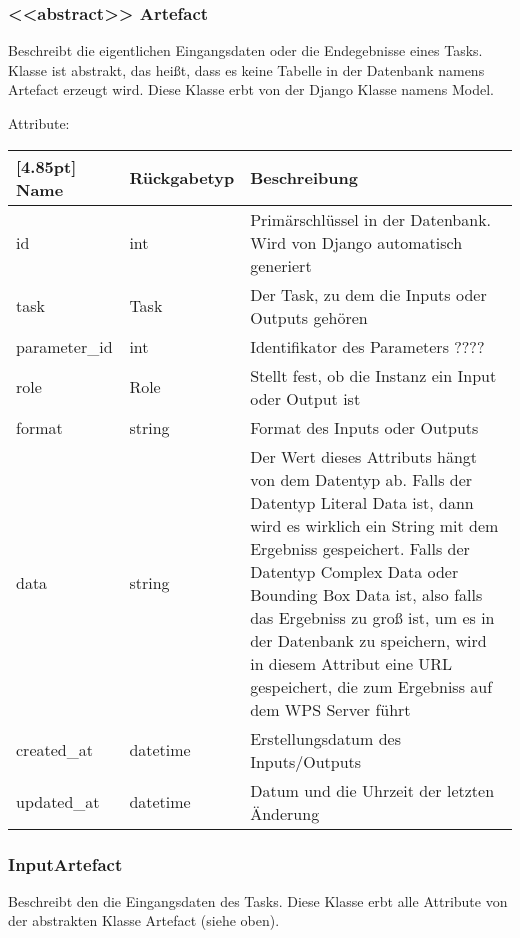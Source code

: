         \subsubsection{<<abstract>> Artefact}
			Beschreibt die eigentlichen Eingangsdaten oder die Endegebnisse eines Tasks. Klasse ist abstrakt, das heißt, dass es keine Tabelle in der Datenbank namens \glqq Artefact \grqq erzeugt wird. \newline 
			Diese Klasse erbt von der Django Klasse namens \glqq Model\grqq .
			
			Attribute:
			\begin{center}
				\setlength\tabcolsep{5pt}
				\renewcommand{\arraystretch}{1.5}
				
				\begin{tabularx}{\textwidth}{|l|l|X|}
					\hline
					\rowcolor[gray]{0.75}[4.85pt]
					Name & Rückgabetyp & Beschreibung \\ \hline 
					id & int & Primärschlüssel in der Datenbank. Wird von Django automatisch generiert \\ \hline
					task & Task & Der Task, zu dem die Inputs oder Outputs gehören\\ \hline
					parameter\_id & int & Identifikator des Parameters ???? \\ \hline
					role & Role & Stellt fest, ob die Instanz ein Input oder Output ist \\ \hline
					format & string & Format des Inputs oder Outputs \\ \hline
					data & string & Der Wert dieses Attributs hängt von dem Datentyp ab. Falls der Datentyp Literal Data ist, dann wird es wirklich ein String mit dem Ergebniss gespeichert. Falls der Datentyp Complex Data oder Bounding Box Data ist, also falls das Ergebniss zu groß ist, um es in der Datenbank zu speichern, wird in diesem Attribut eine URL gespeichert, die zum Ergebniss auf dem WPS Server führt \\ \hline
					created\_at & datetime & Erstellungsdatum des Inputs/Outputs \\ \hline
					updated\_at & datetime & Datum und die Uhrzeit der letzten Änderung \\ \hline
				\end{tabularx}
			\end{center}
        \subsubsection{InputArtefact}
			Beschreibt den die Eingangsdaten des Tasks. \newline
			Diese Klasse erbt alle Attribute von der abstrakten Klasse Artefact (siehe oben).
			
